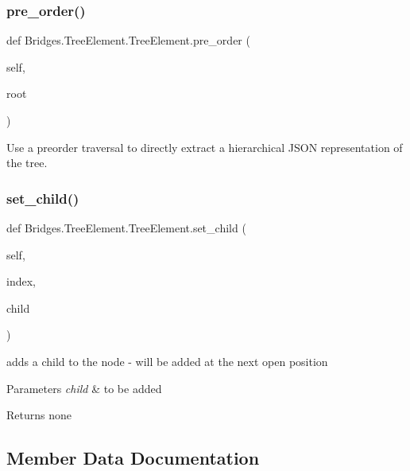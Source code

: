 \subsubsection{\texorpdfstring{pre\+\_\+order()}{pre\_order()}}
{\footnotesize\ttfamily def Bridges.\+Tree\+Element.\+Tree\+Element.\+pre\+\_\+order (\begin{DoxyParamCaption}\item[{}]{self,  }\item[{}]{root }\end{DoxyParamCaption})}



Use a preorder traversal to directly extract a hierarchical J\+S\+ON representation of the tree. 

\mbox{\label{class_bridges_1_1_tree_element_1_1_tree_element_ac03788ed77411b40ba69fb7cce00b3f8}} 
\subsubsection{\texorpdfstring{set\+\_\+child()}{set\_child()}}
{\footnotesize\ttfamily def Bridges.\+Tree\+Element.\+Tree\+Element.\+set\+\_\+child (\begin{DoxyParamCaption}\item[{}]{self,  }\item[{}]{index,  }\item[{}]{child }\end{DoxyParamCaption})}



adds a child to the node -\/ will be added at the next open position 


\begin{DoxyParams}{Parameters}
{\em child} & to be added\\
\hline
\end{DoxyParams}
\begin{DoxyReturn}{Returns}
none 
\end{DoxyReturn}


\subsection{Member Data Documentation}
\mbox{\label{class_bridges_1_1_tree_element_1_1_tree_element_afdfe8877a4c29b5e4f8e983f176dd5de}} 
